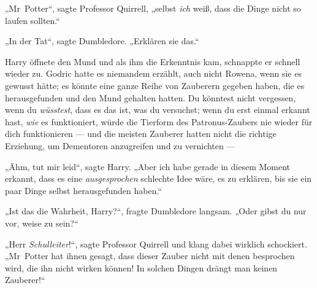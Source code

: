 „Mr~Potter“, sagte Professor Quirrell, „selbst \emph{ich} weiß, dass die Dinge nicht so laufen sollten.“

„In der Tat“, sagte Dumbledore.
„Erklären sie das.“

Harry öffnete den Mund und als ihm die Erkenntnis kam, schnappte er schnell wieder zu. Godric hatte es niemandem erzählt, auch nicht Rowena, wenn sie es gewusst hätte; es könnte eine ganze Reihe von Zauberern gegeben haben, die es herausgefunden und den Mund gehalten hatten. Du könntest nicht vergessen, wenn du \emph{wüsstest}, dass es das ist, was du versuchst; wenn du erst einmal erkannt hast, \emph{wie} es funktioniert, würde die Tierform des Patronus-Zaubers nie wieder für dich funktionieren — und die meisten Zauberer hatten nicht die richtige Erziehung, um Dementoren anzugreifen und zu vernichten —

„Ähm, tut mir leid“, sagte Harry.
„Aber ich habe gerade in diesem Moment erkannt, dass es eine \emph{ausgesprochen} schlechte Idee wäre, es zu erklären, bis sie ein paar Dinge selbst herausgefunden haben.“

„Ist das die Wahrheit, Harry?“, fragte Dumbledore langsam.
„Oder gibst du nur vor, weise zu sein?“

„Herr \emph{Schulleiter}!“, sagte Professor Quirrell und klang dabei wirklich schockiert.
„Mr~Potter hat ihnen gesagt, dass dieser Zauber nicht mit denen besprochen wird, die ihn nicht wirken können! In solchen Dingen drängt man keinen Zauberer!“

